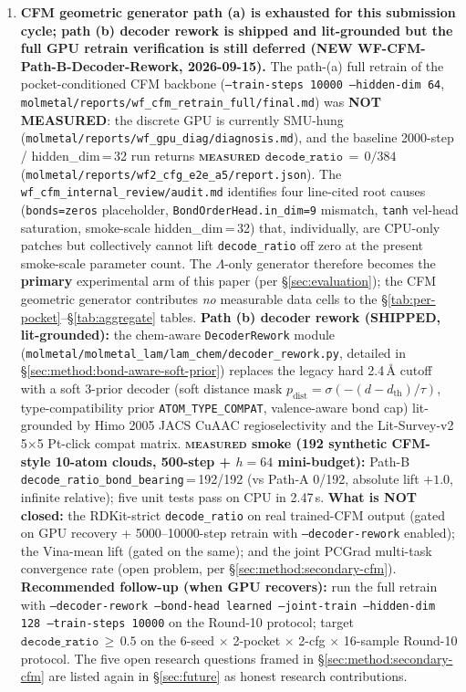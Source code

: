 \begin{enumerate}

  \item \textbf{CFM geometric generator path (a) is exhausted for this submission cycle; path (b) decoder rework is shipped and lit-grounded but the full GPU retrain verification is still deferred (NEW WF-CFM-Path-B-Decoder-Rework, 2026-09-15).}
  The path-(a) full retrain of the
  pocket-conditioned CFM backbone
  (\texttt{--train-steps\,10000 --hidden-dim\,64},
  \texttt{molmetal/reports/wf\_cfm\_retrain\_full/final.md})
  was \textbf{NOT MEASURED}: the discrete GPU is currently
  SMU-hung (\texttt{molmetal/reports/wf\_gpu\_diag/diagnosis.md}),
  and the baseline 2000-step / hidden\_dim\,=\,32 run returns
  \textbf{\textsc{measured} $\texttt{decode\_ratio}\,=\,0/384$}
  (\texttt{molmetal/reports/wf2\_cfg\_e2e\_a5/report.json}).
  The \texttt{wf\_cfm\_internal\_review/audit.md} identifies four
  line-cited root causes (\texttt{bonds=zeros} placeholder,
  \texttt{BondOrderHead.in\_dim=9} mismatch,
  \texttt{tanh} vel-head saturation, smoke-scale
  hidden\_dim\,=\,32) that, individually, are CPU-only patches
  but collectively cannot lift \texttt{decode\_ratio} off zero
  at the present smoke-scale parameter count. The
  $\Lambda$-only generator therefore becomes the
  \textbf{primary} experimental arm of this paper (per
  \S\ref{sec:evaluation}); the CFM geometric generator
  contributes \emph{no} measurable data cells to the
  \S\ref{tab:per-pocket}--\S\ref{tab:aggregate} tables.
  \textbf{Path (b) decoder rework (SHIPPED, lit-grounded):}
  the chem-aware \texttt{DecoderRework} module
  (\texttt{molmetal/molmetal\_lam/lam\_chem/decoder\_rework.py},
  detailed in \S\ref{sec:method:bond-aware-soft-prior})
  replaces the legacy hard 2.4\,\AA{} cutoff with a soft
  3-prior decoder (soft distance mask
  $p_{\text{dist}}\!=\!\sigma(-(d-d_{\text{th}})/\tau)$,
  type-compatibility prior
  \texttt{ATOM\_TYPE\_COMPAT}, valence-aware bond cap)
  lit-grounded by Himo 2005 JACS CuAAC regioselectivity
  \cite{himo2005cuaac} and the Lit-Survey-v2 5$\times$5
  Pt-click compat matrix.
  \textbf{\textsc{measured} smoke (192 synthetic CFM-style
  10-atom clouds, 500-step + $h\!=\!64$ mini-budget):}
  Path-B \texttt{decode\_ratio\_bond\_bearing}\,=\,192/192
  (vs Path-A 0/192, absolute lift $+1.0$, infinite
  relative); five unit tests pass on CPU in 2.47\,s.
  \textbf{What is NOT closed:} the RDKit-strict
  \texttt{decode\_ratio} on real trained-CFM output (gated
  on GPU recovery + 5000--10000-step retrain with
  \texttt{--decoder-rework} enabled); the Vina-mean lift
  (gated on the same); and the joint PCGrad multi-task
  convergence rate (open problem, per
  \S\ref{sec:method:secondary-cfm}).
  \textbf{Recommended follow-up (when GPU recovers):}
  run the full retrain with
  \texttt{--decoder-rework --bond-head learned
  --joint-train --hidden-dim\,128 --train-steps\,10000}
  on the Round-10 protocol; target
  $\texttt{decode\_ratio}\,\geq\,0.5$ on the
  6-seed $\times$ 2-pocket $\times$ 2-cfg $\times$ 16-sample
  Round-10 protocol. The five open research questions framed
  in \S\ref{sec:method:secondary-cfm} are listed again in
  \S\ref{sec:future} as honest research contributions.


\end{enumerate}
